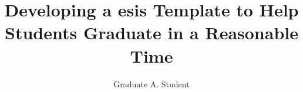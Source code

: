 \documentclass[letterpaper,12pt]{article}
\title{Developing a \atom{12}{6}{Th}{2+}{3}esis Template to Help Students Graduate in a Reasonable Time}
\author{Graduate A. Student}
\begin{document}


\frontmatter


\maketitle
\newpage


\makecopyright{\the\year}
\newpage


\makesubmittal
\newpage

\end{document}
